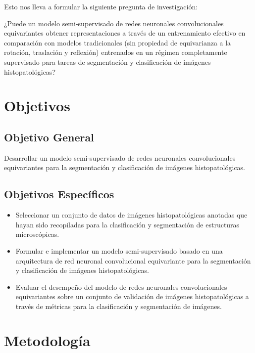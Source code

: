 \documentclass[12pt,letterpaper,final, openany]{scrbook}
\begin{document}
Esto nos lleva a formular la siguiente pregunta de investigación:

¿Puede un modelo semi-supervisado de redes neuronales convolucionales equivariantes obtener representaciones a través de un entrenamiento efectivo en comparación con modelos tradicionales (sin propiedad de equivarianza a la rotación, traslación y reflexión) entrenados en un régimen completamente supervisado para tareas de segmentación y clasificación de imágenes histopatológicas?


\newpage
\chapter{Objetivos}
\section{Objetivo General}

Desarrollar un modelo semi-supervisado de redes neuronales convolucionales equivariantes para la segmentación y clasificación de imágenes histopatológicas.


\section{Objetivos Específicos}

\begin{itemize}
    \item Seleccionar un conjunto de datos de imágenes histopatológicas anotadas que hayan sido recopiladas para la clasificación y segmentación de estructuras microscópicas.

    \item Formular e implementar un modelo semi-supervisado basado en una arquitectura de red neuronal convolucional equivariante para la segmentación y clasificación de imágenes histopatológicas.

    \item Evaluar el desempeño del modelo de redes neuronales convolucionales equivariantes sobre un conjunto de validación de imágenes histopatológicas a través de métricas para la clasificación y segmentación de imágenes.


\end{itemize}


\newpage
\chapter{Metodología}
\end{document}
